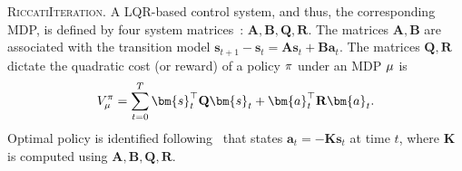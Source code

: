 \noindent\textsc{RiccatiIteration.}
A LQR-based control system, and thus, the corresponding MDP, is defined by four system matrices~\citep{kalman1960new}: $\mathbf{A}, \mathbf{B}, \mathbf{Q},\mathbf{R}$. The matrices $\mathbf{A, B}$ are associated with the transition model $\bm{s}_{t+1}-\bm{s}_t = \mathbf{A}\bm{s}_t + \mathbf{B}\bm{a}_t$. The matrices $\mathbf{Q, R}$ dictate the quadratic cost (or reward) of a policy $\pi$ under an MDP $\mu$ is
\begin{equation*}
    V_{\mdp}^\pol = \sum_{t=0}^T \bm{s}_t^\top \mathbf{Q}\bm{s}_t + \bm{a}_t^\top \mathbf{R}\bm{a}_t.
\end{equation*}
Optimal policy is identified following~\citep{willems1971least} that states $\bm{a}_t = -\mathbf{K}\bm{s}_t$ at time $t$, where $\mathbf{K}$ is computed using $\mathbf{A}, \mathbf{B}, \mathbf{Q},\mathbf{R}$. %
